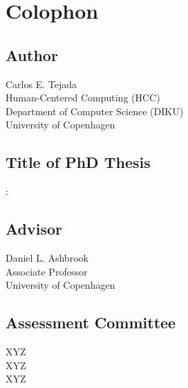 \pagestyle{empty}


\section*{Colophon}
	\bigskip

	\noindent
	
	\subsection*{Author}
	Carlos E. Tejada\\
	Human-Centered Computing (HCC)\\
	Department of Computer Science (DIKU)\\
	University of Copenhagen
	
	\subsection*{Title of PhD Thesis}
	\myTitle: \mySubtitle
	
	\subsection*{Advisor}
	Daniel L. Ashbrook\\
	Associate Professor\\
	University of Copenhagen
	
	\subsection*{Assessment Committee}
	XYZ\\
	XYZ\\
	XYZ